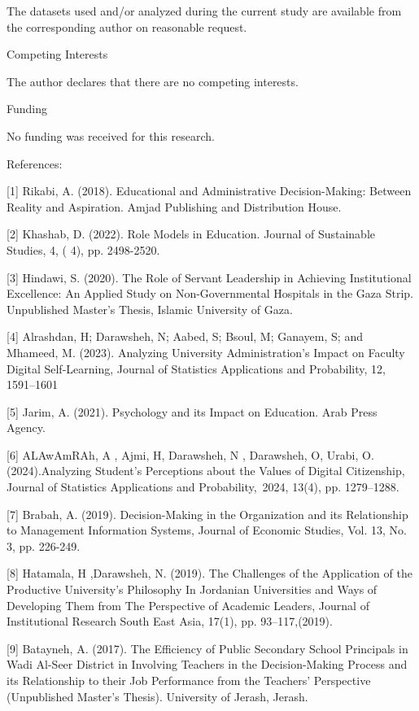 \documentclass[10pt]{NSP1}
\begin{document}
The datasets used and/or analyzed during the current study are available from the corresponding author on reasonable request.

Competing Interests

The author declares that there are no competing interests.

Funding

No funding was received for this research.

References:

[1] Rikabi, A. (2018). Educational and Administrative Decision-Making: Between Reality and Aspiration. Amjad Publishing and Distribution House.

[2] Khashab, D. (2022). Role Models in Education. Journal of Sustainable Studies, 4, ( 4), pp. 2498-2520.

[3] Hindawi, S. (2020). The Role of Servant Leadership in Achieving Institutional Excellence: An Applied Study on Non-Governmental Hospitals in the Gaza Strip. Unpublished Master's Thesis, Islamic University of Gaza.

[4] Alrashdan, H; Darawsheh, N; Aabed, S; Bsoul, M; Ganayem, S; and Mhameed, M. (2023). Analyzing University Administration's Impact on Faculty Digital Self-Learning, Journal of Statistics Applications and Probability, 12, 1591–1601

[5] Jarim, A. (2021). Psychology and its Impact on Education. Arab Press Agency.

[6] ALAwAmRAh, A , Ajmi, H, Darawsheh, N , Darawsheh, O, Urabi, O.(2024).Analyzing Student's Perceptions about the Values of Digital Citizenship, Journal of Statistics Applications and Probability, 2024, 13(4), pp. 1279–1288.

[7] Brabah, A. (2019). Decision-Making in the Organization and its Relationship to Management Information Systems, Journal of Economic Studies, Vol. 13, No. 3, pp. 226-249.

[8] Hatamala, H ,Darawsheh, N. (2019). The Challenges of the Application of the Productive University’s Philosophy In Jordanian Universities and Ways of Developing Them from The Perspective of Academic Leaders, Journal of Institutional Research South East Asia, 17(1), pp. 93–117,(2019).

[9] Batayneh, A. (2017). The Efficiency of Public Secondary School Principals in Wadi Al-Seer District in Involving Teachers in the Decision-Making Process and its Relationship to their Job Performance from the Teachers' Perspective (Unpublished Master's Thesis). University of Jerash, Jerash.
\end{document}
